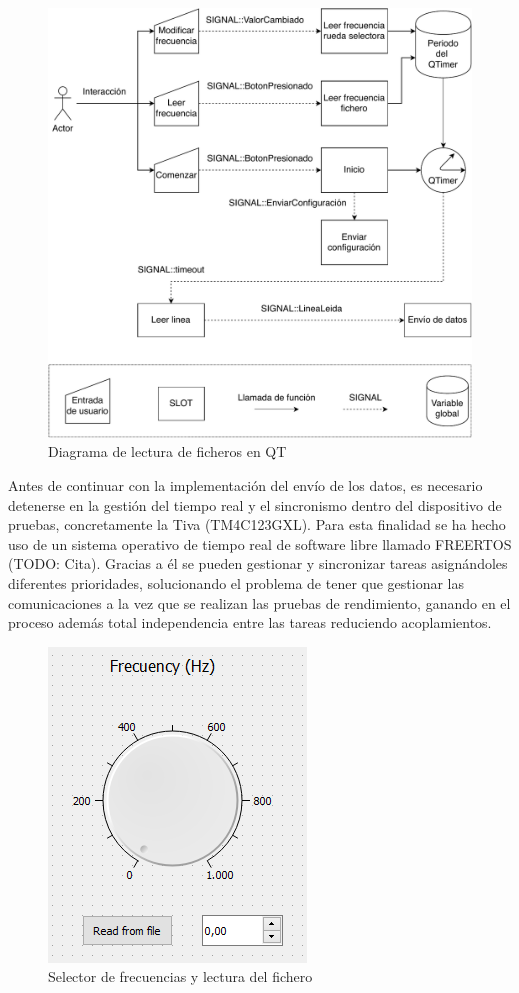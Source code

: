         \begin{figure} [H] 
                \centering
                        \includegraphics[width =\linewidth]{figuras/CompleteFileRead.pdf}
                \caption{Diagrama de lectura de ficheros en QT}
                \label{fig:CompleteFileRead}
        \end{figure}

        Antes de continuar con la implementación del envío de los datos, es necesario detenerse en la gestión del tiempo real y el sincronismo dentro del dispositivo de pruebas, concretamente la Tiva (TM4C123GXL). Para esta finalidad se ha hecho uso de un sistema operativo de tiempo real de software libre llamado FREERTOS (TODO: Cita). Gracias a él se pueden gestionar y sincronizar tareas asignándoles diferentes prioridades, solucionando el problema de tener que gestionar las comunicaciones a la vez que se realizan las pruebas de rendimiento, ganando en el proceso además total independencia entre las tareas reduciendo acoplamientos.
        
        \begin{figure}[H]
                \centering
                        \includegraphics[width =0.4\linewidth]{figuras/FrecKnob.png}
                \caption{Selector de frecuencias y lectura del fichero}
                \label{fig:frecKnob}
        \end{figure}

